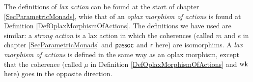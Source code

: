 \documentclass[11pt]{report}
\begin{document}
\begin{definition}
\begin{itemize}
  \end{itemize}
  \label{DefSequoidalCategory}
\end{definition}
\begin{remark}
  The definitions of \emph{lax action} can be found at the start of chapter \ref{SecParametricMonads}, whie that of an \emph{oplax morphism of actions} is found at Definition \ref{DefOplaxMorphismOfActions}.  
  The definitions we have used are similar: a \emph{strong action} is a lax action in which the coherences (called $m$ and $e$ in chapter \ref{SecParametricMonads} and $\operatorname{{\mathsf{passoc}}}$ and $\operatorname{{\mathsf{r}}}$ here) are isomorphims.  
  A \emph{lax morphism of actions} is defined in the same way as an oplax morphism, except that the coherence (called $\mu$ in Definition \ref{DefOplaxMorphismOfActions} and $\operatorname{wk}$ here) goes in the opposite direction.
\end{remark}
\end{document}
